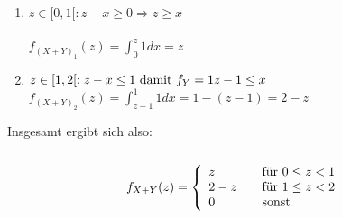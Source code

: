 \begin{uebsp}
\begin{Answer}
\begin{enumerate}
\item{$z \in [0,1[:  z-x \ge 0\Rightarrow z \ge x $ \\ \\ $f_{(X+Y)_1}(z)=\int_{0}^{z}1dx=z$ } 
        \item{$z \in [1,2[: z-x  \le 1 \text{ damit } f_Y = 1\\ z-1\le x$\\
$f_{(X+Y)_2}(z)=\int_{z-1}^{1}1dx=1-(z-1)=2-z$} 
\end{enumerate}

Insgesamt ergibt sich also:\\ \\


\[ f_{X+Y}(z) = \left\{
    \begin{array}{l l}
      z & \quad \text{für $0 \le z < 1$}\\
      2-z & \quad \text{für $1 \le z <2$}\\
      0 & \quad \text{sonst}
    \end{array} \right.\]

\end{Answer}
\end{uebsp}
